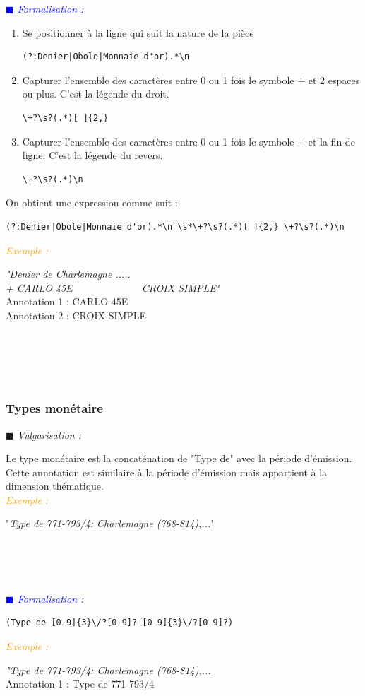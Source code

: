 \documentclass[a4paper, 11pt]{report}
\newenvironment{vulgarisation}
    {
    \textit{\textcolor{dark-blue}{$\blacksquare$  Vulgarisation : \\}}

    }
    {
    ~\\~\\
    }
\newenvironment{formalisation}
    {
    \textit{\textcolor{blue}{$\blacksquare$  Formalisation : \\}}
    }
    {
    ~\\~\\
    }
\newenvironment{exemple}
    {
    \textit{\textcolor{orange}{
    Exemple : \\}}
    }
    {
    ~\\
    }
\begin{document}
\begin{formalisation}
    \begin{enumerate}
        \item Se positionner à la ligne qui suit la nature de la pièce
              \begin{verbatim}
(?:Denier|Obole|Monnaie d'or).*\n
        \end{verbatim}
        \item Capturer l'ensemble des caractères entre 0 ou 1 fois le symbole + et 2 espaces ou plus. C'est la légende du droit.
              \begin{verbatim}
\+?\s?(.*)[ ]{2,}
        \end{verbatim}
        \item Capturer l'ensemble des caractères entre 0 ou 1 fois le symbole + et la fin de ligne. C'est la légende du revers.
              \begin{verbatim}
\+?\s?(.*)\n
        \end{verbatim}
    \end{enumerate}
    
    On obtient une expression comme suit : 
    \begin{verbatim}
(?:Denier|Obole|Monnaie d'or).*\n \s*\+?\s?(.*)[ ]{2,} \+?\s?(.*)\n
    \end{verbatim}
    
    \begin{exemple}
        \emph{"Denier de Charlemagne ..... \\+ CARLO  45E~~~~~~~~~~~~~ CROIX SIMPLE"}\\
        Annotation 1 : CARLO  45E \\
        Annotation 2 : CROIX SIMPLE
    \end{exemple}
\end{formalisation}

\subsubsection{Types monétaire}
\begin{vulgarisation}
    Le type monétaire est la concaténation de "Type de" avec la période d'émission. Cette annotation est similaire à la période d'émission mais appartient à la dimension thématique.\\
    \begin{exemple}
        "\emph{Type de 771-793/4: Charlemagne (768-814),...}"
    \end{exemple}
\end{vulgarisation}
\begin{formalisation}
    \begin{verbatim}
(Type de [0-9]{3}\/?[0-9]?-[0-9]{3}\/?[0-9]?)
    \end{verbatim}
    \begin{exemple}
        \emph{"Type de 771-793/4: Charlemagne (768-814),...}\\
        Annotation 1 : Type de 771-793/4 
    \end{exemple}
\end{formalisation}
\end{document}
